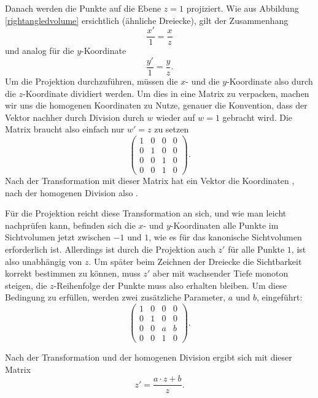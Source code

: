 Danach werden die Punkte auf die Ebene $z=1$ projiziert. Wie aus Abbildung \ref{rightangledvolume} ersichtlich (ähnliche Dreiecke), gilt der Zusammenhang
\begin{equation}
 \frac{x'}{1} = \frac{x}{z}
\end{equation}
und analog für die $y$-Koordinate
\begin{equation}
 \frac{y'}{1} = \frac{y}{z}.
\end{equation}
Um die Projektion durchzuführen, müssen die $x$- und die $y$-Koordinate also durch die $z$-Koordinate dividiert werden. Um dies in eine Matrix zu verpacken, machen wir uns die homogenen Koordinaten zu Nutze, genauer die Konvention, dass der Vektor nachher durch Division durch $w$ wieder auf $w=1$ gebracht wird. Die Matrix braucht also einfach nur $w' = z$ zu setzen
\begin{equation}
 \begin{pmatrix}
  1 & 0 & 0 & 0 \\
  0 & 1 & 0 & 0 \\
  0 & 0 & 1 & 0 \\
  0 & 0 & 1 & 0
 \end{pmatrix}.
\end{equation}
Nach der Transformation mit dieser Matrix hat ein Vektor die Koordinaten , nach der homogenen Division also .

Für die Projektion reicht diese Transformation an sich, und wie man leicht nachprüfen kann, befinden sich die $x$- und $y$-Koordinaten alle Punkte im Sichtvolumen jetzt zwischen $-1$ und $1$, wie es für das kanonische Sichtvolumen erforderlich ist. Allerdings ist durch die Projektion auch $z'$ für alle Punkte $1$, ist also unabhängig von $z$. Um später beim Zeichnen der Dreiecke die Sichtbarkeit korrekt bestimmen zu können, muss $z'$ aber mit wachsender Tiefe monoton steigen, die $z$-Reihenfolge der Punkte muss also erhalten bleiben. Um diese Bedingung zu erfüllen, werden zwei zusätzliche Parameter, $a$ und $b$, eingeführt:
\begin{equation}
 \begin{pmatrix}
  1 & 0 & 0 & 0 \\
  0 & 1 & 0 & 0 \\
  0 & 0 & a & b \\
  0 & 0 & 1 & 0
 \end{pmatrix}.
\end{equation}

Nach der Transformation und der homogenen Division ergibt sich mit dieser Matrix
\begin{equation}
 z' = \frac{a \cdot z + b}{z}.
\end{equation}


